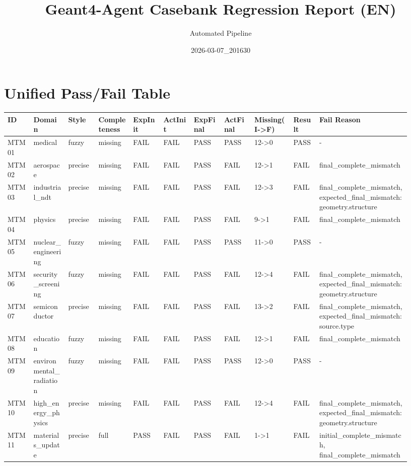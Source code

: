 \documentclass[11pt]{ctexart}
\title{Geant4-Agent Casebank Regression Report (EN)}
\author{Automated Pipeline}
\date{2026-03-07\_201630}
\begin{document}
\maketitle
\section{Unified Pass/Fail Table}
\begin{longtable}{p{0.06\linewidth}p{0.08\linewidth}p{0.07\linewidth}p{0.08\linewidth}p{0.07\linewidth}p{0.07\linewidth}p{0.07\linewidth}p{0.07\linewidth}p{0.09\linewidth}p{0.06\linewidth}p{0.21\linewidth}}
\toprule
ID & Domain & Style & Completeness & ExpInit & ActInit & ExpFinal & ActFinal & Missing(I->F) & Result & Fail Reason \\
\midrule
MTM01 & medical & fuzzy & missing & FAIL & FAIL & PASS & PASS & 12->0 & PASS & - \\
MTM02 & aerospace & precise & missing & FAIL & FAIL & PASS & FAIL & 12->1 & FAIL & final\_complete\_mismatch \\
MTM03 & industrial\_ndt & precise & missing & FAIL & FAIL & PASS & FAIL & 12->3 & FAIL & final\_complete\_mismatch, expected\_final\_mismatch:geometry.structure \\
MTM04 & physics & precise & missing & FAIL & FAIL & PASS & FAIL & 9->1 & FAIL & final\_complete\_mismatch \\
MTM05 & nuclear\_engineering & fuzzy & missing & FAIL & FAIL & PASS & PASS & 11->0 & PASS & - \\
MTM06 & security\_screening & fuzzy & missing & FAIL & FAIL & PASS & FAIL & 12->4 & FAIL & final\_complete\_mismatch, expected\_final\_mismatch:geometry.structure \\
MTM07 & semiconductor & precise & missing & FAIL & FAIL & PASS & FAIL & 13->2 & FAIL & final\_complete\_mismatch, expected\_final\_mismatch:source.type \\
MTM08 & education & fuzzy & missing & FAIL & FAIL & PASS & FAIL & 12->1 & FAIL & final\_complete\_mismatch \\
MTM09 & environmental\_radiation & fuzzy & missing & FAIL & FAIL & PASS & PASS & 12->0 & PASS & - \\
MTM10 & high\_energy\_physics & precise & missing & FAIL & FAIL & PASS & FAIL & 12->4 & FAIL & final\_complete\_mismatch, expected\_final\_mismatch:geometry.structure \\
MTM11 & materials\_update & precise & full & PASS & FAIL & PASS & FAIL & 1->1 & FAIL & initial\_complete\_mismatch, final\_complete\_mismatch \\

\end{longtable}
\end{document}
